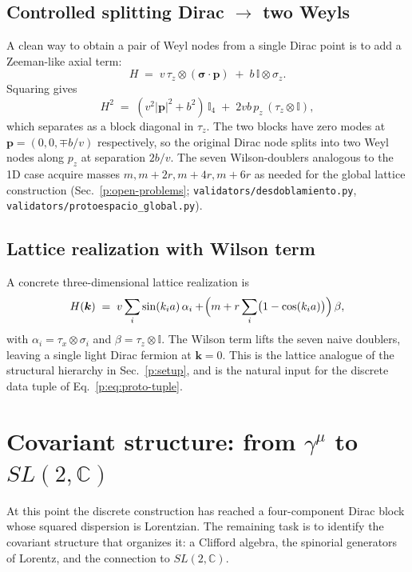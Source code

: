 \documentclass[a4paper,onecolumn,11pt]{quantumarticle}
\newcommand{\bbI}{\ensuremath{\mathbb{I}}}
\newcommand{\bbC}{\ensuremath{\mathbb{C}}}
\def\vk{\ensuremath{\bm{k}}}
\def\vp{\ensuremath{\bm{p}}}
\def\vsigma{\ensuremath{\bm{\sigma}}}
\newcommand{\Hop}{\ensuremath{H}}
\begin{document}
\subsection{Controlled splitting Dirac \texorpdfstring{$\to$}{->} two Weyls}
A clean way to obtain a pair of Weyl nodes from a single Dirac point is
to add a Zeeman-like axial term:
\begin{equation}
\Hop \;=\; v\,\tau_{z}\otimes(\vsigma\cdot\vp)
       \;+\; b\,\bbI\otimes\sigma_{z} .
\end{equation}
Squaring gives
\begin{equation}
\Hop^{2}\;=\;(v^{2}\lvert\vp\rvert^{2} + b^{2})\,\bbI_{4}
   \;+\; 2 v b\,p_{z}\,(\tau_{z}\otimes\bbI) ,
\end{equation}
which separates as a block diagonal in $\tau_{z}$. The two blocks have
zero modes at $\vp=(0,0,\mp b/v)$ respectively, so the original Dirac
node splits into two Weyl nodes along $p_{z}$ at separation $2b/v$. The
seven Wilson-doublers analogous to the 1D case acquire masses
$m, m+2r, m+4r, m+6r$ as needed for the global lattice construction
(Sec.~\ref{p:open-problems}; \texttt{validators/desdoblamiento.py},
\texttt{validators/protoespacio\_global.py}).

\subsection{Lattice realization with Wilson term}
A concrete three-dimensional lattice realization is
\begin{equation}
\Hop(\vk) \;=\; v \sum_{i}\sin(k_{i}a)\,\alpha_{i}
       + \!\Bigl(m + r\sum_{i}\bigl(1-\cos(k_{i}a)\bigr)\Bigr)\,\beta ,
\label{p:eq:Wilson3D}
\end{equation}
with $\alpha_{i}=\tau_{x}\otimes\sigma_{i}$ and $\beta=\tau_{z}\otimes\bbI$. The
Wilson term lifts the seven naive doublers, leaving a single light Dirac
fermion at $\vk=0$. This is the lattice analogue of the structural
hierarchy in Sec.~\ref{p:setup}, and is the natural input for the
discrete data tuple of Eq.~\eqref{p:eq:proto-tuple}.


\section{Covariant structure: from \texorpdfstring{$\gamma^{\mu}$}{gamma\^mu} to \texorpdfstring{$SL(2,\mathbb{C})$}{SL(2,C)}}
\label{p:covariant}

At this point the discrete construction has reached a four-component
Dirac block whose squared dispersion is Lorentzian. The remaining task
is to identify the covariant structure that organizes it: a Clifford
algebra, the spinorial generators of Lorentz, and the connection to
$SL(2,\bbC)$.
\end{document}

